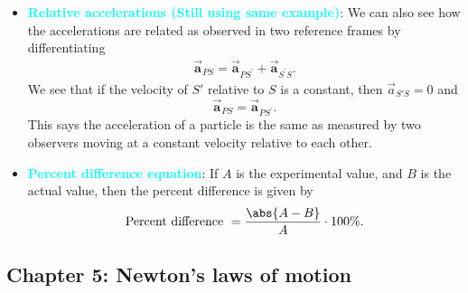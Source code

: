 \documentclass{report}
\begin{document}
\begin{itemize}
        \item \textbf{\textcolor{cyan}{Relative accelerations (Still using same example)}}:  We can also see how the accelerations are related as observed in two reference frames by differentiating
            \begin{align*}
                \vec{\mathbf{a}}_{PS} = \vec{\mathbf{a}}_{PS^{\prime}} + \vec{\mathbf{a}}_{S^{\prime}S}
            .\end{align*}
            We see that if the velocity of \(S'\) relative to \(S\) is a constant, then \(\vec{a}_{S'S} = 0\) and
            \[
                \vec{\mathbf{a}}_{PS} = \vec{\mathbf{a}}_{PS^{\prime}}.
            \]
            This says the acceleration of a particle is the same as measured by two observers moving at a constant velocity relative to each other.
        \item \textbf{\textcolor{cyan}{Percent difference equation}}: If $A$ is the experimental value, and $B$ is the actual value, then the percent difference is given by
            \begin{align*}
                \text{Percent difference } = \frac{\abs{A - B}}{A} \cdot 100\%
            .\end{align*}
        \end{itemize}
        \pagebreak 
        \subsection{Chapter 5: Newton's laws of motion}
        \bigbreak \noindent 
\end{document}
